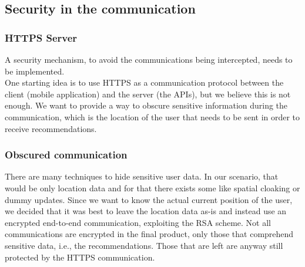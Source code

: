 \documentclass[../../main]{subfiles}
\begin{document}
\subsection{Security in the communication}
\label{ss:security-in-communication}

\subsubsection{HTTPS Server}
\label{sss:https-server}
A security mechanism, to avoid the communications being intercepted, needs to be implemented.\\
One starting idea is to use HTTPS as a communication protocol between the client (mobile application) and the server (the APIs), but we believe this is not enough.
We want to provide a way to obscure sensitive information during the communication, which is the location of the user that needs to be sent in order to receive recommendations.

\subsubsection{Obscured communication}
\label{sss:obscured-communication}
There are many techniques to hide sensitive user data. In our scenario, that would be only location data and for that there exists some like spatial cloaking or dummy updates.
Since we want to know the actual current position of the user, we decided that it was best to leave the location data as-is and instead use an encrypted end-to-end communication, exploiting the RSA scheme.
Not all communications are encrypted in the final product, only those that comprehend sensitive data, i.e., the recommendations.
Those that are left are anyway still protected by the HTTPS communication.
\end{document}
